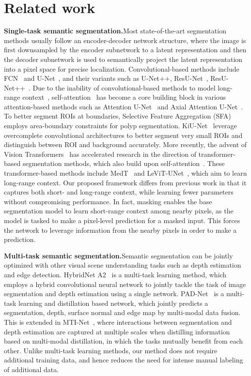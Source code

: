 \documentclass{bmvc2k}
\begin{document}
\section{Related work}
\medskip\noindent\textbf{Single-task semantic segmentation.}\quad Most state-of-the-art segmentation methods usually follow an encoder-decoder network structure, where the image is first downsampled by the encoder subnetwork to a latent representation and then the decoder subnetwork is used to semantically project the latent representation into a pixel space for precise localization. Convolutional-based methods include FCN~\cite{long2015fully} and U-Net~\cite{ronneberger2015u}, and their variants such as U-Net++\cite{zhou2019unet++}, ResU-Net~\cite{xiao2018weighted}, ResU-Net++~\cite{jha2019resunet++}. Due to the inability of convolutional-based methods to model long-range context~\cite{wang2020axial}, self-attention~\cite{vaswani2017attention} has become a core building block in various attention-based methods such as Attention U-Net~\cite{oktay2018attention} and Axial Attention U-Net~\cite{wang2020axial}. To better segment ROIs at boundaries, Selective Feature Aggregation (SFA)~\cite{fang2019selective} employs area-boundary constraints for polyp segmentation. KiU-Net~\cite{valanarasu2021kiu} leverage overcomplete convolutional architectures to better segment very small ROIs and distinguish between ROI and background accurately. More recently, the advent of Vision Transformers~\cite{dosovitskiy2020vit} has accelerated research in the direction of transformer-based segmentation methods, which also build upon self-attention~\cite{vaswani2017attention}. These transformer-based methods include MedT~\cite{valanarasu2021medical} and LeViT-UNet~\cite{xu2021levit}, which aim to learn long-range context. Our proposed framework differs from previous work in that it captures both short- and long-range context, while learning fewer parameters without compromising performance. In fact, masking enables the base segmentation model to learn short-range context among nearby pixels, as the model is tasked to make a pixel-level prediction for a masked input. This forces the network to leverage information from the nearby pixels in order to make a prediction.

\medskip\noindent\textbf{Multi-task semantic segmentation.}\quad Semantic segmentation can be jointly optimized with other visual scene understanding tasks such as depth estimation and edge detection. HybridNet A2~\cite{lin2019depth} is a multi-task learning method, which employs a hybrid convolutional neural network to jointly tackle the task of image segmentation and depth estimation using a single network. PAD-Net~\cite{xu2018pad} is a multi-task learning and distillation based network, which jointly predicts a segmentation, depth, surface normal and edge map by multi-modal data fusion. This is extended in MTI-Net~\cite{vandenhende2020mti}, where interactions between segmentation and depth estimation are captured at multiple scales when distilling information based on multi-modal distillation, in which the tasks mutually benefit from each other. Unlike multi-task learning methods, our method does not require additional training data, and hence reduces the need for intense manual labeling of additional data.
\end{document}
